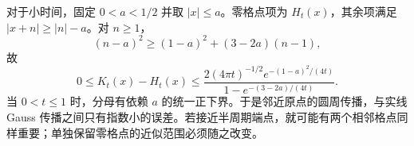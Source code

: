 \ProseParagraphBreak

对于小时间，固定 \(0<a<1/2\) 并取 \(|x|\leq a\)。零格点项为 \(H_t(x)\)，其余项满足 \(|x+n|\geq|n|-a\)。对 \(n\geq1\)，
\[
 (n-a)^2\geq(1-a)^2+(3-2a)(n-1),
\]
故
\[
 0\leq K_t(x)-H_t(x)
 \leq\frac{2(4\pi t)^{-1/2}e^{-(1-a)^2/(4t)}}
              {1-e^{-(3-2a)/(4t)}}.
\]
当 \(0<t\leq1\) 时，分母有依赖 \(a\) 的统一正下界。于是邻近原点的圆周传播，与实线 Gauss 传播之间只有指数小的误差。若接近半周期端点，就可能有两个相邻格点同样重要；单独保留零格点的近似范围必须随之改变。
